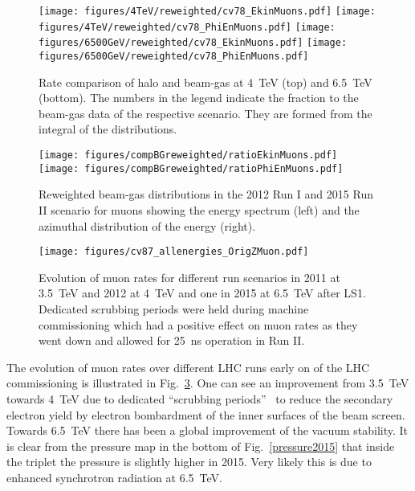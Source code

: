 \begin{figure}
\begin{center}
  \texttt{[image: figures/4TeV/reweighted/cv78\_EkinMuons.pdf]}
  \texttt{[image: figures/4TeV/reweighted/cv78\_PhiEnMuons.pdf]}
  \texttt{[image: figures/6500GeV/reweighted/cv78\_EkinMuons.pdf]}
  \texttt{[image: figures/6500GeV/reweighted/cv78\_PhiEnMuons.pdf]}
\end{center}
\vspace{-0.6cm}
 \caption{Rate comparison of halo and beam-gas at 4~TeV (top) and 6.5~TeV (bottom). The numbers in the legend indicate the fraction to the beam-gas data of the respective scenario. They are formed from the integral of the distributions.
  \label{compAllBKG_run12}}
\end{figure}

\begin{figure}%
\centering

\texttt{[image: figures/compBGreweighted/ratioEkinMuons.pdf]}
\texttt{[image: figures/compBGreweighted/ratioPhiEnMuons.pdf]}
\caption{Reweighted beam-gas distributions in the 2012 Run I and 2015 Run II scenario for muons showing the energy spectrum (left) and the azimuthal distribution of the energy (right).
  \label{fig:compBGreweighted1}}
\end{figure}


\begin{figure}
\begin{center}
  \texttt{[image: figures/cv87\_allenergies\_OrigZMuon.pdf]}
\end{center}
\vspace{-0.6cm}
 \caption{Evolution of muon rates for different run scenarios in 2011 at 3.5~TeV and 2012 at 4~TeV and one in 2015 at 6.5~TeV after LS1. Dedicated scrubbing periods were held during machine commissioning which had a positive effect on muon rates as they went down and allowed for 25~ns operation in Run II.
  \label{fig:OrigZMuon}} 
\end{figure}


The evolution of muon rates over different LHC runs early on of the LHC commissioning is illustrated in Fig.~\ref{fig:OrigZMuon}. One can see an improvement from 3.5~TeV towards 4~TeV due to dedicated ``scrubbing periods''~\cite{scrubbingreportGianni} to reduce the secondary electron yield by electron bombardment of the inner surfaces of the beam screen. Towards 6.5~TeV there has been a global improvement of the vacuum stability. It is clear from the pressure map in the bottom of Fig.~\ref{pressure2015} that inside the triplet the pressure is slightly higher in 2015. Very likely this is due to enhanced synchrotron radiation at 6.5~TeV. 

